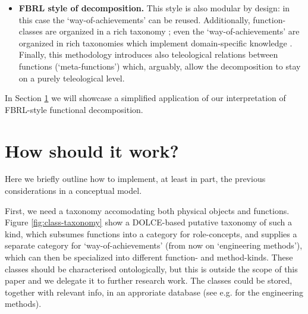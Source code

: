 \documentclass[
]{ceurart}
\begin{document}
\begin{itemize}
  \item \textbf{FBRL style of decomposition.} This style is also modular by design: in this case the `way-of-achievements' can be reused. Additionally, function-classes are organized in a rich taxonomy%
  ; even the `way-of-achievements' are organized in rich taxonomies which implement domain-specific knowledge \cite{kitamuraOntologybasedDescriptionFunctional2003}. Finally, this methodology introduces also teleological relations between functions (`meta-functions') which, arguably, allow the decomposition to stay on a purely teleological level. 
\end{itemize}
In Section \ref{sec:use-case} we will showcase a simplified application of our interpretation of FBRL-style functional decomposition.


\section{How should it work?}\label{sec:use-case}

Here we briefly outline how to implement, at least in part, the previous considerations in a conceptual model.

First, we need a taxonomy accomodating both physical objects and functions. Figure \ref{fig:class-taxonomy} show a DOLCE-based \cite{borgoDOLCEDescriptiveOntology2022} putative taxonomy of such a kind, which subsumes functions into a category for role-concepts, and %
supplies a separate category for `way-of-achievements' (from now on `engineering methods'), which can then be specialized into different function- and method-kinds. These classes should be characterised ontologically, but this is outside the scope of this paper and we delegate it to further research work. The classes could be stored, together with relevant info, in an approriate database (see e.g. \cite{kitamuraOntologybasedDescriptionFunctional2003} for the engineering methods).
\end{document}
